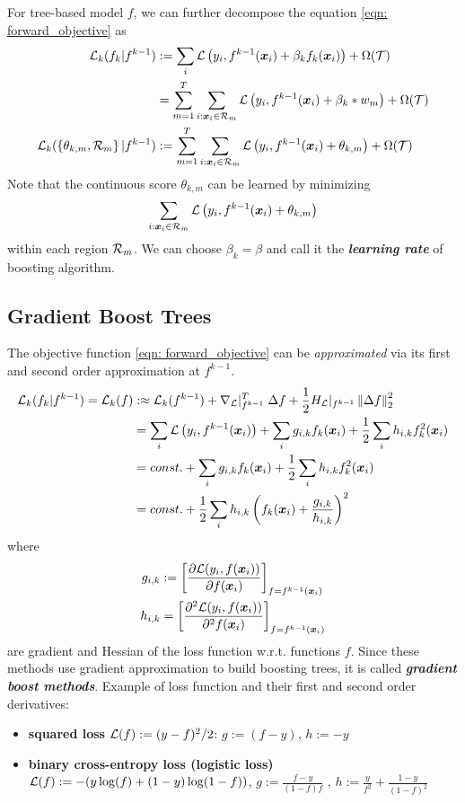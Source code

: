 \documentclass[11pt]{article}
\begin{document}
For tree-based model $f$, we can further decompose the equation \eqref{eqn: forward_objective} as 
\begin{align}
{\mathcal L}_{k}(f_{k} | f^{k-1}) &:=  \sum_{i}{\mathcal L}\left(y_i, f^{k-1}(\boldsymbol{x}_{i}) +\beta_{k} f_{k}(\boldsymbol{x}_{i})\right) + \Omega({\mathcal T}) \nonumber\\
&=  \sum_{m=1}^{T}\sum_{i: \boldsymbol{x}_{i} \in {\mathcal R}_{m}}{\mathcal L}\left(y_i, f^{k-1}(\boldsymbol{x}_{i}) +\beta_{k}*w_{m} \right) + \Omega({\mathcal T}) \nonumber\\
{\mathcal L}_{k}(\left\{\theta_{k,m}, {\mathcal R}_{m}\right\} | f^{k-1})&:=  \sum_{m=1}^{T}\sum_{i: \boldsymbol{x}_{i} \in {\mathcal R}_{m}}{\mathcal L}\left(y_i, f^{k-1}(\boldsymbol{x}_{i}) +\theta_{k,m} \right) + \Omega({\mathcal T}) \label{eqn: forward_objective_tree}
\end{align} Note that the continuous score $\theta_{k,m}$ can be learned by minimizing $$\sum_{i: \boldsymbol{x}_{i} \in {\mathcal R}_{m}}{\mathcal L}\left(y_i, f^{k-1}(\boldsymbol{x}_{i}) +\theta_{k,m} \right)$$ within each region ${\mathcal R}_{m}$. We can choose $\beta_{k} = \beta$ and call it the \textbf{\emph{learning rate}} of boosting algorithm.


\subsection{Gradient Boost Trees}
The objective function \eqref{eqn: forward_objective} can be \emph{approximated} via its first and second order approximation at $f^{k-1}$. 
\begin{align}
{\mathcal L}_{k}(f_{k} | f^{k-1}) = {\mathcal L}_{k}(f) &:\approx  {\mathcal L}_{k}(f^{k-1}) + \nabla_{{\mathcal L}}|_{f^{k-1}}^{T}\;\Delta f + \frac{1}{2}H_{{\mathcal L}}|_{f^{k-1}} \left\|\Delta f\right\|_{2}^2  \nonumber\\
&=   \sum_{i}{\mathcal L}\left(y_i, f^{k-1}(\boldsymbol{x}_{i})\right) + \sum_{i}g_{i,k} f_{k}(\boldsymbol{x}_{i}) + \frac{1}{2}\sum_{i}h_{i,k} f_{k}^2(\boldsymbol{x}_{i}) \nonumber\\
&= const. +  \sum_{i}g_{i,k} f_{k}(\boldsymbol{x}_{i}) + \frac{1}{2}\sum_{i}h_{i,k} f_{k}^2(\boldsymbol{x}_{i}) \label{eqn: forward_objective_grad} \\
&= const. + \frac{1}{2} \sum_{i}h_{i,k}\left(f_{k}(\boldsymbol{x}_{i}) + \frac{g_{i,k}}{h_{i,k}}\right)^{2} \label{eqn: forward_objective_grad_weight}
\end{align} where 
\begin{align*}
g_{i,k} &:= \left[\frac{\partial {\mathcal L}(y_i, f(\boldsymbol{x}_{i}))}{\partial f(\boldsymbol{x}_{i})}\right]_{f=f^{k-1}(\boldsymbol{x}_{i})} \\
h_{i,k} &=  \left[\frac{\partial^2 {\mathcal L}(y_i, f(\boldsymbol{x}_{i}))}{\partial^{2} f(\boldsymbol{x}_{i})}\right]_{f=f^{k-1}(\boldsymbol{x}_{i})}
\end{align*} are gradient and Hessian of the loss function w.r.t. functions $f$. Since these methods use gradient approximation to build boosting trees, it is called \emph{\textbf{gradient boost methods}}. Example of loss function and their first and second order derivatives:
\begin{itemize}
\item \textbf{squared loss} ${\mathcal L}(f) := (y-f)^2 /2$: $g:= (f-y)$, $h := -y$
\item  \textbf{binary cross-entropy loss (logistic loss)} ${\mathcal L}(f) :=-( y\log(f) + (1-y)\log(1-f))$, $g:= \frac{f-y}{(1- f)f}$ , $h :=\frac{y}{f^2} + \frac{1-y}{(1-f)^2}$
\end{itemize}
\end{document}
